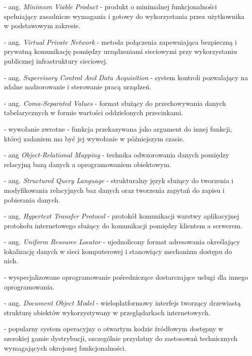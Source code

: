 \documentclass{sprz}
\begin{document}
\begin{description}[align=left]
  \item [MVP] - ang. \textit{Minimum Viable Product} - produkt o minimalnej funkcjonalności spełniający zasadnicze wymagania i gotowy do wykorzystania przez użytkownika w podstawowym zakresie.
  \item [VPN] - ang. \textit{Virtual Private Network} - metoda połączenia zapewniająca bezpieczną i prywatną komunikację pomiędzy urządzeniami sieciowymi przy wykorzystaniu publicznej infrastruktury sieciowej.
  \item [SCADA] - ang. \textit{Supervisory Control And Data Acquisition} - system kontroli pozwalający na zdalne nadzorowanie i sterowanie pracą urządzeń.
  \item [CSV] - ang. \textit{Coma-Separated Values} - format służący do przechowywania danych tabelarycznych w formie wartości oddzielonych przecinkami.
  \item [Callback] - wywołanie zwrotne - funkcja przekazywana jako argument do innej funkcji, której zadaniem ma być jej wywołanie w późniejszym czasie.
  \item [ORM] - ang \textit{Object-Relational Mapping} - technika odwzorowania danych pomiędzy relacyjną bazą danych a oprogramowaniem obiektowym.
  \item [SQL] - ang. \textit{Structured Query Language} - strukturalny język służący do tworzenia i modyfikowania relacyjnych baz danych oraz tworzenia zapytań do zapisu i pobierania danych.
  \item [HTTP] - ang. \textit{Hypertext Transfer Protocol} - protokół komunikacji warstwy aplikacyjnej protokołu internetowego służący do komunikacji pomiędzy klientem a serwerem.
  \item [URL] - ang. \textit{Uniform Resource Locator} - ujednolicony format adresowania określający lokalizację danych w sieci komputerowej i stanowiący mechanizm dostępu do nich.
  \item [Middleware] - wyspecjalizowane oprogramowanie pośredniczące dostarczające usługi dla innego oprogramowania.
  \item [DOM] - ang. \textit{Document Object Model} - wieloplatformowy interfejs tworzący drzewiastą strukturę obiektów wykorzystywany w przeglądarkach internetowych.
  \item [Linux] - popularny system operacyjny o otwartym kodzie źródłowym dostępny w szerokiej gamie dystrybucji, szczególnie przydatny do zastosowań technicznych wymagających okrojonej funkcjonalności.

\end{description}
\end{document}
